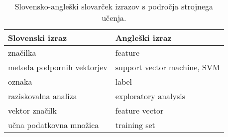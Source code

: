 \begin{table}[ht]
	\centering
	\begin{tabular}{ll}
		\hline
		\textbf{Slovenski izraz} & \textbf{Angleški izraz} \\
		\hline
		
		značilka & feature \\
		metoda podpornih vektorjev & support vector machine, SVM \\
		oznaka & label \\
		raziskovalna analiza & exploratory analysis \\
		vektor značilk & feature vector \\
		učna podatkovna množica & training set \\		
	\end{tabular}
	\caption{Slovensko-angleški slovarček izrazov s področja strojnega učenja.}
	\label{slovar}
\end{table}
